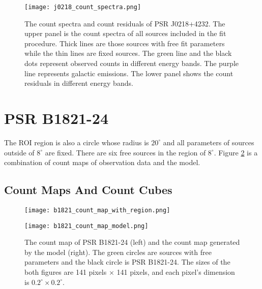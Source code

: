 \documentclass[12pt]{report}
\newcommand{\mycaption}[1]{\protect \caption{#1}}
\begin{document}
      \begin{figure}[!htp]
        \centering
        \texttt{[image: j0218\_count\_spectra.png]}
        \caption{The count spectra and count residuals of PSR J0218+4232.
                The upper panel is the count spectra of all sources included in the 
                fit procedure. Thick lines are those sources with free fit parameters 
                while the thin lines are fixed sources. The green line and the black 
                dots represent observed counts in different energy bands. The purple 
                line represents galactic emissions. The lower panel shows the count 
                residuals in different energy bands. } 
        \label{fig: j0218_count_spectra}
      \end{figure}

  \section{PSR B1821-24}
    The ROI region is also a circle whose radius is $20^\circ$ and all 
    parameters of sources outside of $8^\circ$ are fixed. 
    There are six free sources in the region of $8^\circ$. Figure
    \ref{fig: b1821_count_map_with_region_and_model} 
    is a combination of count maps of observation data and the model. 

    \subsection{Count Maps And Count Cubes}
      \begin{figure}[!ht]
        \begin{center}
        \begin{minipage}{0.45\textwidth}
          \centering 
          \texttt{[image: b1821\_count\_map\_with\_region.png]}
        \end{minipage}
        \begin{minipage}{0.45\textwidth}
          \centering
          \texttt{[image: b1821\_count\_map\_model.png]}
        \end{minipage}
      \end{center}
      \mycaption{The count map of PSR B1821-24 (left) and the count map generated by 
        the model (right). The green circles are sources with free parameters and the black circle
        is PSR B1821-24. The sizes of the both figures are 141 pixels $\times$ 141 pixels, and 
        each pixel's dimension is $0.2^\circ \times 0.2^\circ$.}
      \label{fig: b1821_count_map_with_region_and_model}
      \end{figure}
  
\end{document}
